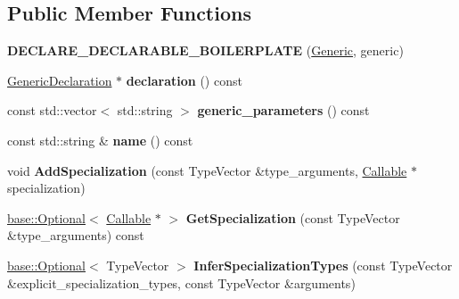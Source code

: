 \subsection*{Public Member Functions}
\begin{DoxyCompactItemize}
\item 
\mbox{\label{classv8_1_1internal_1_1torque_1_1Generic_a66e01413e355dd8e47fc671e22d97b6f}} 
{\bfseries D\+E\+C\+L\+A\+R\+E\+\_\+\+D\+E\+C\+L\+A\+R\+A\+B\+L\+E\+\_\+\+B\+O\+I\+L\+E\+R\+P\+L\+A\+TE} (\mbox{\hyperlink{classv8_1_1internal_1_1torque_1_1Generic}{Generic}}, generic)
\item 
\mbox{\label{classv8_1_1internal_1_1torque_1_1Generic_aac588f94d00c0d9cd3884c42a80ccaf1}} 
\mbox{\hyperlink{structv8_1_1internal_1_1torque_1_1GenericDeclaration}{Generic\+Declaration}} $\ast$ {\bfseries declaration} () const
\item 
\mbox{\label{classv8_1_1internal_1_1torque_1_1Generic_a7a4beadfb79d3427e672fbea51a2787c}} 
const std\+::vector$<$ std\+::string $>$ {\bfseries generic\+\_\+parameters} () const
\item 
\mbox{\label{classv8_1_1internal_1_1torque_1_1Generic_a544beb3ca02ec8a417d315a746017397}} 
const std\+::string \& {\bfseries name} () const
\item 
\mbox{\label{classv8_1_1internal_1_1torque_1_1Generic_abb905c66e28a7eb5313904c2a9e89d62}} 
void {\bfseries Add\+Specialization} (const Type\+Vector \&type\+\_\+arguments, \mbox{\hyperlink{classv8_1_1internal_1_1torque_1_1Callable}{Callable}} $\ast$specialization)
\item 
\mbox{\label{classv8_1_1internal_1_1torque_1_1Generic_af9ffdf02d5f3dd75639d9e9cdbc8c2a7}} 
\mbox{\hyperlink{classv8_1_1base_1_1Optional}{base\+::\+Optional}}$<$ \mbox{\hyperlink{classv8_1_1internal_1_1torque_1_1Callable}{Callable}} $\ast$ $>$ {\bfseries Get\+Specialization} (const Type\+Vector \&type\+\_\+arguments) const
\item 
\mbox{\label{classv8_1_1internal_1_1torque_1_1Generic_a45867df95cf0ed06d90b54a3a6806d27}} 
\mbox{\hyperlink{classv8_1_1base_1_1Optional}{base\+::\+Optional}}$<$ Type\+Vector $>$ {\bfseries Infer\+Specialization\+Types} (const Type\+Vector \&explicit\+\_\+specialization\+\_\+types, const Type\+Vector \&arguments)
\end{DoxyCompactItemize}
